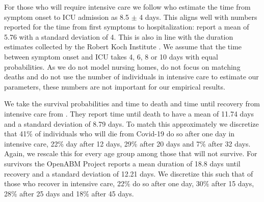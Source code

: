 %
%
%
%

For those who will require intensive care we follow \citet{Chen2020} who estimate the
time from symptom onset to ICU admission as 8.5 $\pm$ 4 days. This aligns well with
numbers reported for the time from first symptoms to hospitalization:
\citet{Gaythorpe2020} report a mean of 5.76 with a standard deviation of 4. This is also
in line with the duration estimates collected by the Robert Koch Institute
\citep{RKI2021b}. We assume that the time between symptom onset and ICU takes 4, 6, 8 or
10 days with equal probabilities. As we do not model nursing homes, do not focus on
matching deaths and do not use the number of individuals in intensive care to estimate
our parameters, these numbers are not important for our empirical results.



We take the survival probabilities and time to death and time until recovery from
intensive care from \citet{Hinch2021}. They report time until death to have a mean of
11.74 days and a standard deviation of 8.79 days. To match this approximately we
discretize that 41\% of individuals who will die from Covid-19 do so after one day in
intensive care, 22\% day after 12 days, 29\% after 20 days and 7\% after 32 days. Again,
we rescale this for every age group among those that will not survive. For survivors the
OpenABM Project reports a mean duration of 18.8 days until recovery and a standard
deviation of 12.21 days. We discretize this such that of those who recover in intensive
care, 22\% do so after one day, 30\% after 15 days, 28\% after 25 days and 18\% after 45
days.

\FloatBarrier
